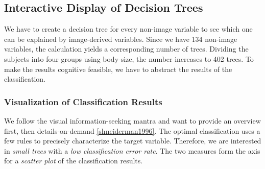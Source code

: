\documentclass[a4paper,twoside]{style/article}
\begin{document}
\subsection{Interactive Display of Decision Trees}
We have to create a decision tree for every non-image variable to see which one can be explained by image-derived variables.
Since we have 134 non-image variables, the calculation yields a corresponding number of trees.
Dividing the subjects into four groups using body-size, the number increases to 402 trees.
To make the results cognitive feasible, we have to abstract the results of the classification.
\subsubsection{Visualization of Classification Results}
We follow the visual information-seeking mantra and want to provide an overview first, then details-on-demand \ref{shneiderman1996}.
The optimal classification uses a few rules to precisely characterize the target variable.
Therefore, we are interested in \emph{small trees} with a \emph{low classification error rate}.
The two measures form the axis for a \emph{scatter plot} of the classification results.
\end{document}

